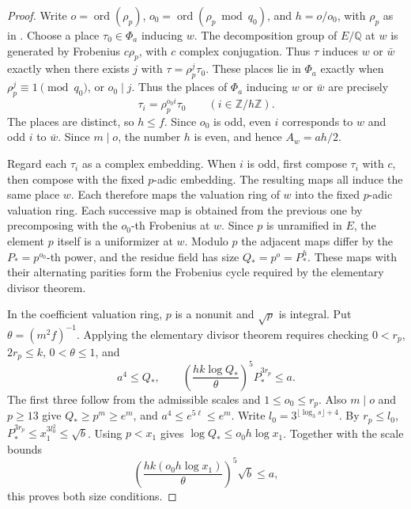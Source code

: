 \begin{proof}
Write $o=\operatorname{ord}(\rho_p)$, $o_0=\operatorname{ord}(\rho_p\bmod q_0)$, and $h=o/o_0$, with $\rho_p$ as in . Choose a place $\tau_0\in\Phi_a$ inducing $w$. The decomposition group of $E/\mathbb Q$ at $w$ is generated by Frobenius $c\rho_p$, with $c$ complex conjugation. Thus $\tau$ induces $w$ or $\bar w$ exactly when there exists $j$ with $\tau=\rho_p^j\tau_0$. These places lie in $\Phi_a$ exactly when $\rho_p^j\equiv1\pmod{q_0}$, or $o_0\mid j$. Thus the places of $\Phi_a$ inducing $w$ or $\bar w$ are precisely
\[
 \tau_i=\rho_p^{o_0 i}\tau_0\qquad (i\in\mathbb Z/h\mathbb Z).
\]
The places are distinct, so $h\le f$. Since $o_0$ is odd, even $i$ corresponds to $w$ and odd $i$ to $\bar w$. Since $m\mid o$, the number $h$ is even, and hence $A_w=ah/2$.

Regard each $\tau_i$ as a complex embedding. When $i$ is odd, first compose $\tau_i$ with $c$, then compose with the fixed $p$-adic embedding. The resulting maps all induce the same place $w$. Each therefore maps the valuation ring of $w$ into the fixed $p$-adic valuation ring. Each successive map is obtained from the previous one by precomposing with the $o_0$-th Frobenius at $w$. Since $p$ is unramified in $E$, the element $p$ itself is a uniformizer at $w$. Modulo $p$ the adjacent maps differ by the $P_*=p^{o_0}$-th power, and the residue field has size $Q_*=p^o=P_*^h$. These maps with their alternating parities form the Frobenius cycle required by the elementary divisor theorem.

In the coefficient valuation ring, $p$ is a nonunit and $\sqrt p$ is integral. Put $\theta=(m^2f)^{-1}$. Applying the elementary divisor theorem requires checking $0<r_p$, $2r_p\le k$, $0<\theta\le1$, and
\[
 a^4\le Q_*,
 \qquad
 \left(\frac{h k\log Q_*}{\theta}\right)^5P_*^{3r_p}\le a.
\]
The first three follow from the admissible scales and $1\le o_0\le r_p$. Also $m\mid o$ and $p\ge13$ give $Q_*\ge p^m\ge e^m$, and $a^4\le e^{5\ell}\le e^m$. Write $l_0=3^{\lfloor\log_3 s\rfloor+4}$. By $r_p\le l_0$, $P_*^{3r_p}\le x_1^{3l_0^2}\le\sqrt b$. Using $p<x_1$ gives $\log Q_*\le o_0h\log x_1$. Together with the scale bounds
\[
 \left(\frac{h k(o_0h\log x_1)}{\theta}\right)^5\sqrt b\le a,
\]
this proves both size conditions.


\end{proof}
